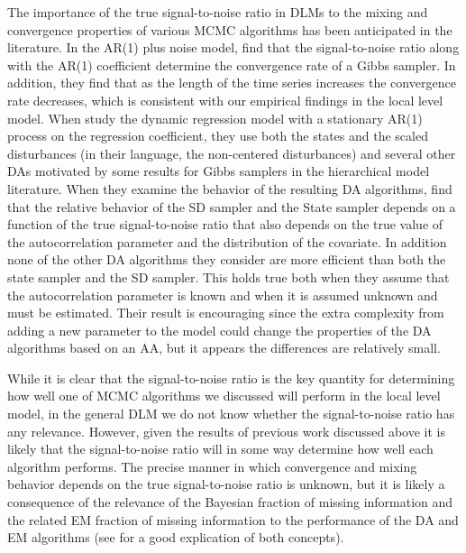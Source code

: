 \documentclass[12pt]{article}
\begin{document}
The importance of the true signal-to-noise ratio in DLMs to the mixing and convergence properties of various MCMC algorithms has been anticipated in the literature. In the AR(1) plus noise model, \citet{pitt1999analytic} find that the signal-to-noise ratio along with the AR(1) coefficient determine the convergence rate of a Gibbs sampler. In addition, they find that as the length of the time series increases the convergence rate decreases, which is consistent with our empirical findings in the local level model. When \citet{fruhwirth2004efficient} study the dynamic regression model with a stationary AR(1) process on the regression coefficient, they use both the states and the scaled disturbances (in their language, the non-centered disturbances) and several other DAs motivated by some results for Gibbs samplers in the hierarchical model literature. When they examine the behavior of the resulting DA algorithms, \citet{fruhwirth2004efficient} find that the relative behavior of the SD sampler and the State sampler depends on a function of the true signal-to-noise ratio that also depends on the true value of the autocorrelation parameter and the distribution of the covariate. In addition none of the other DA algorithms they consider are more efficient than both the state sampler and the SD sampler. This holds true both when they assume that the autocorrelation parameter is known and when it is assumed unknown and must be estimated. Their result is encouraging since the extra complexity from adding a new parameter to the model could change the properties of the DA algorithms based on an AA, but it appears the differences are relatively small.

While it is clear that the signal-to-noise ratio is the key quantity for determining how well one of MCMC algorithms we discussed will perform in the local level model, in the general DLM we do not know whether the signal-to-noise ratio has any relevance. However, given the results of previous work discussed above it is likely that the signal-to-noise ratio will in some way determine how well each algorithm performs. The precise manner in which convergence and mixing behavior depends on the true signal-to-noise ratio is unknown, but it is likely a consequence of the relevance of the Bayesian fraction of missing information and the related EM fraction of missing information to the performance of the DA and EM algorithms (see \citet{van2001art} for a good explication of both concepts).

\end{document}

